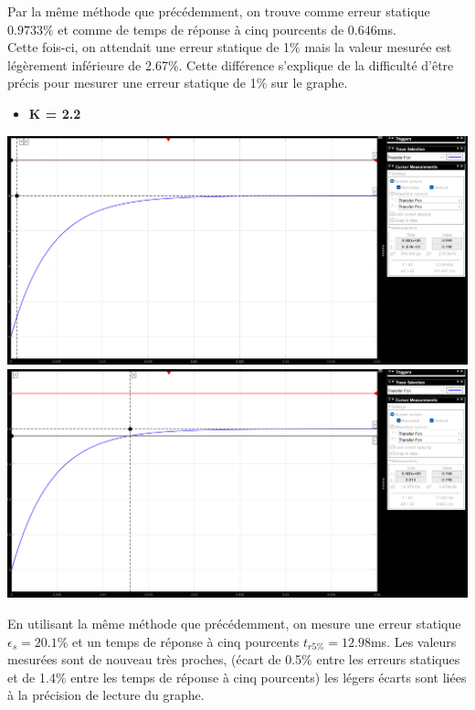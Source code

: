 \documentclass[12pt]{article}
\begin{document}
\normalsize Par la même méthode que précédemment, on trouve comme erreur statique $0.9733\%$ et comme de temps de réponse à cinq pourcents de $0.646$ms.
\\Cette fois-ci, on attendait une erreur statique de 1$\%$ mais la valeur mesurée est légèrement inférieure de 2.67$\%$. Cette différence s'explique de la difficulté d'être précis pour mesurer une erreur statique de 1$\%$ sur le graphe.

\begin{itemize}
    \item \bf \large K = 2.2
\end{itemize}
\begin{center}
    \includegraphics[width = 19 cm]{TP2 Simulink/Syst_1/Err_statique_syst_1_K=2.2.png}
    \includegraphics[width = 19 cm]{TP2 Simulink/Syst_1/tr5prct_syst_1_K=2.2.png}
\end{center}
\normalsize En utilisant la même méthode que précédemment, on mesure une erreur statique $\epsilon_s = 20.1\%$ et un temps de réponse à cinq pourcents $t_{r5\%} = 12.98$ms.
Les valeurs mesurées sont de nouveau très proches, (écart de 0.5$\%$ entre les erreurs statiques et de 1.4$\%$ entre les temps de réponse à cinq pourcents) les légers écarts sont liées à la précision de lecture du graphe.
\end{document}
